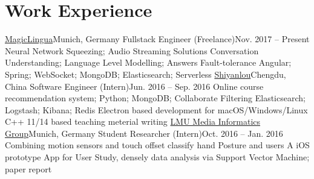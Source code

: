 \section{\textbf{Work Experience}}
  \resumeSubHeadingListStart
    \resumeSubheading
    {\href{https://magiclingua.com/}{MagicLingua}}{Munich, Germany}
    {Fullstack Engineer (Freelance)}{Nov. 2017 -- Present}
    \resumeItemListStart
        {Neural Network Squeezing; Audio Streaming Solutions}
        {Conversation Understanding; Language Level Modelling; Answers Fault-tolerance}
        {Angular; Spring; WebSocket; MongoDB; Elasticsearch; Serverless}
    \resumeItemListEnd
    \resumeSubheading
      {\href{https://shiyanlou.com/}{Shiyanlou}}{Chengdu, China}
      {Software Engineer (Intern)}{Jun. 2016 -- Sep. 2016}
      \resumeItemListStart
          {Online course recommendation system; Python; MongoDB; Collaborate Filtering}
          {Elasticsearch; Logstash; Kibana; Redis}
          {Electron based development for macOS/Windows/Linux}
          {C++ 11/14 based teaching meterial writing}
      \resumeItemListEnd
    \resumeSubheading
      {\href{http://www.medien.ifi.lmu.de}{LMU Media Informatics Group}}{Munich, Germany}
      {Student Researcher (Intern)}{Oct. 2016 -- Jan. 2016}
      \resumeItemListStart
          {Combining motion sensors and touch offset classify hand Posture and users}
          {A iOS prototype App for User Study, densely data analysis via Support Vector Machine; paper report}
      \resumeItemListEnd
  \resumeSubHeadingListEnd